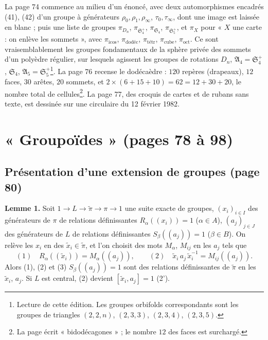 \documentclass[11pt,a4paper]{article}
\begin{document}
La page 74 commence au milieu d'un énoncé, avec deux automorphismes encadrés
(41), (42) d'un groupe à générateurs $\rho_0, \rho_1, \rho_\infty$, $\tau_0,
\tau_\infty$, dont une image est laissée en blanc ; puis une liste de groupes
$\pi_{D_n}$, $\pi_{\mathfrak{S}_4^{+}}$, $\pi_{\mathfrak{S}_4}$,
$\pi_{\mathfrak{S}_5^{+}}$, et $\pi_X$ pour « $X$ une carte : on enlève les
sommets », avec $\pi_{\mathrm{icos}}$, $\pi_{\text{dodéc}}$,
$\pi_{\text{tétr}}$, $\pi_{\mathrm{cube}}$, $\pi_{\mathrm{oct}}$. Ce sont
vraisemblablement les groupes fondamentaux de la sphère privée des sommets
d'un polyèdre régulier, sur lesquels agissent les groupes de rotations
$D_n$, $\mathfrak{A}_4 = \mathfrak{S}_4^{+}$, $\mathfrak{S}_4$, $\mathfrak{A}_5 =
\mathfrak{S}_5^{+}$\footnote{Lecture de cette édition. Les groupes orbifolds
correspondants sont les groupes de triangles $(2,2,n)$, $(2,3,3)$, $(2,3,4)$,
$(2,3,5)$.}. La page 76 recense le dodécaèdre : $120$ repères (drapeaux),
$12$ faces, $30$ arêtes, $20$ sommets, et $2 \times (6 + 15 + 10) = 62 = 12 + 30
+ 20$, le nombre total de cellules\footnote{La page écrit « bidodécagones » ;
le nombre $12$ des faces est surchargé.}. La page 77, des croquis de cartes
et de rubans sans texte, est dessinée sur une circulaire du 12 février 1982.

\section*{« Groupoïdes » (pages 78 à 98)}

\subsection*{Présentation d'une extension de groupes (page 80)}

\textbf{Lemme 1.} Soit $1 \to L \to \tilde\pi \to \pi \to 1$ une suite exacte
de groupes, $(x_i)_{i \in I}$ des générateurs de $\pi$ de relations
définissantes $R_\alpha((x_i)) = 1$ ($\alpha \in A$), $(a_j)_{j \in J}$ des
générateurs de $L$ de relations définissantes $S_\beta((a_j)) = 1$ ($\beta \in
B$). On relève les $x_i$ en des $\tilde x_i \in \tilde\pi$, et l'on choisit des
mots $M_\alpha$, $M_{ij}$ en les $a_j$ tels que
\[
(1)\quad R_\alpha((\tilde x_i)) = M_\alpha((a_j)), \qquad (2)\quad \tilde
x_{i}\, a_{j}\, \tilde x_{i}^{-1} = M_{ij}((a_j)).
\]
Alors (1), (2) et (3) $S_\beta((a_j)) = 1$ sont des relations définissantes de
$\tilde\pi$ en les $\tilde x_i$, $a_j$. Si $L$ est central, (2) devient
$[\tilde x_i, a_j] = 1$ (2').
\end{document}

